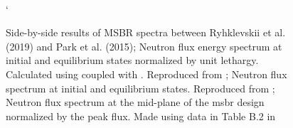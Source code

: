 \begin{figure}[!htpb]
    \centering
    \\`
    \caption[Side-by-side results of MSBR spectra between Ryhklevskii et al, (2019) and Park et al. (2015)]{
    Side-by-side results of MSBR spectra between Ryhklevskii et al. (2019) and Park et al. (2015);
     Neutron flux energy spectrum at
    initial and equilibrium states normalized by unit lethargy. Calculated using \SaltProc coupled
    with \SerpentTWO. Reproduced
    from \cite{rykhlevskii_modeling_2019}; 
    Neutron flux spectrum at initial and equilibrium states. Reproduced from
    \cite{park_whole_2015};  Neutron flux
    spectrum at the mid-plane of the \Gls{msbr} design normalized by the peak flux. Made using data in Table B.2 in \cite{robertson_conceptual_1971}}
    \label{fig:msbr_spectrum_comp}
\end{figure}

